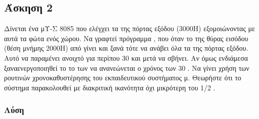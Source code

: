 \newpage \subsection*{Άσκηση 2}

Δίνεται ένα μΥ-Σ 8085 που ελέγχει τα  της πόρτας εξόδου (3000Η) εξομοιώνοντας με αυτά τα φώτα ενός χώρου.
Να γραφτεί πρόγραμμα , που όταν το  της θύρας εισόδου  (θέση μνήμης 2000Η) 
από  γίνει  και ξανά  τότε να ανάβει όλα τα  της πόρτας εξόδου. 
Αυτό να παραμένει ανοιχτό για περίπου 30  και μετά να σβήνει. Αν όμως ενδιάμεσα ξαναενεργοποιηθεί 
το  το  των  να ανανεώνεται ο χρόνος των 30 . 
Να γίνει χρήση των ρουτινών χρονοκαθυστέρησης του εκπαιδευτικού συστήματος μ. Θεωρήστε ότι το
σύστημα παρακολουθεί με διακριτική ικανότητα όχι μικρότερη του 1/2 .

\subsubsection*{Λύση}


\inputminted{text}{./ex2/ex2.8085}
